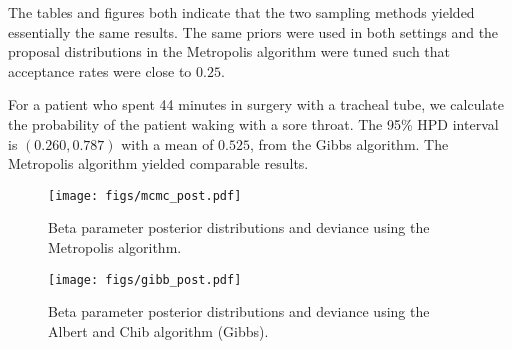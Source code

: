 \documentclass[12pt]{article}
\begin{document}
\noindent The tables and figures both indicate that the two sampling methods yielded essentially the same results. The same priors were used in both settings and the proposal distributions in the Metropolis algorithm were tuned such that acceptance rates were close to $0.25$.
\bigskip

\noindent For a patient who spent 44 minutes in surgery with a tracheal tube, we calculate the probability of the patient waking with a sore throat. The 95\% HPD interval is $(0.260, 0.787)$ with a mean of $0.525$, from the Gibbs algorithm. The Metropolis algorithm yielded comparable results.


\begin{figure}[H]
\begin{center}
\texttt{[image: figs/mcmc\_post.pdf]}
\caption{Beta parameter posterior distributions and deviance using the Metropolis algorithm.}
\end{center}
\end{figure}



\begin{figure}[H]
\begin{center}
\texttt{[image: figs/gibb\_post.pdf]}
\caption{Beta parameter posterior distributions and deviance using the Albert and Chib algorithm (Gibbs).}
\end{center}
\end{figure}
\end{document}
